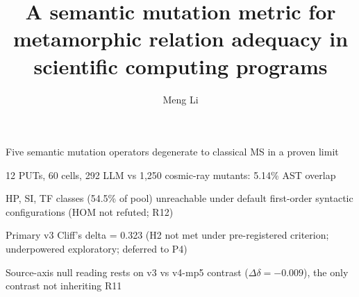 \documentclass[review,12pt,authoryear]{elsarticle}
\begin{document}
\begin{frontmatter}

\title{A semantic mutation metric for metamorphic relation adequacy in scientific computing programs}

\author[a]{Meng Li}


\begin{highlights}
\item Five semantic mutation operators degenerate to classical MS in a proven limit
\item 12 PUTs, 60 cells, 292 LLM vs 1,250 cosmic-ray mutants: 5.14\% AST overlap
\item HP, SI, TF classes (54.5\% of pool) unreachable under default first-order syntactic configurations (HOM not refuted; R12)
\item Primary v3 Cliff's delta = 0.323 (H2 not met under pre-registered criterion; underpowered exploratory; deferred to P4)
\item Source-axis null reading rests on v3 vs v4-mp5 contrast ($\Delta\delta = -0.009$), the only contrast not inheriting R11
\end{highlights}


\end{frontmatter}
\end{document}
